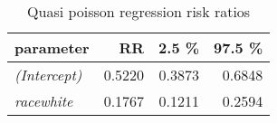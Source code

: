 \begin{wraptable}{r}{2.5in}

\caption{\label{tab:quasipoisson_reg_RR}Quasi poisson regression risk ratios}
\centering
\fontsize{9}{11}\selectfont
\begin{tabular}[t]{>{}lrrr}
\toprule
parameter & RR & 2.5 \% & 97.5 \%\\
\midrule
\em{(Intercept)} & 0.5220 & 0.3873 & 0.6848\\
\em{racewhite} & 0.1767 & 0.1211 & 0.2594\\
\bottomrule
\end{tabular}
\end{wraptable}
